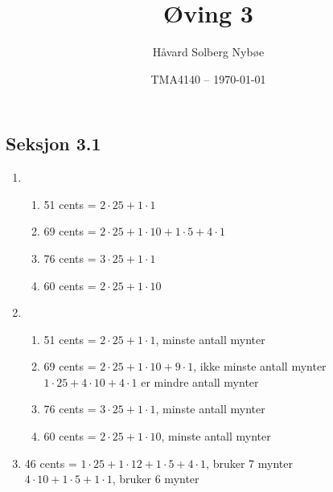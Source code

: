 \documentclass[a4paper, 12pt]{article}  %
\title{Øving 3}                         %
\author{Håvard Solberg Nybøe}           %
\date{TMA4140 -- \today}                %
\begin{document}
\maketitle

\subsection*{Seksjon 3.1}
\begin{enumerate}
    \item [\boxed{57}]
          \begin{enumerate}
              \item 51 cents = $2 \cdot 25 + 1 \cdot 1$
              \item 69 cents = $2 \cdot 25 + 1 \cdot 10 + 1 \cdot 5 + 4 \cdot 1$
              \item 76 cents = $3 \cdot 25 + 1 \cdot 1$
              \item 60 cents = $2 \cdot 25 + 1 \cdot 10$
          \end{enumerate}
    \item [\boxed{59}]
          \begin{enumerate}
              \item 51 cents = $2 \cdot 25 + 1 \cdot 1$, minste antall mynter
              \item 69 cents = $2 \cdot 25 + 1 \cdot 10 + 9 \cdot 1$, ikke minste antall mynter \\
                    $1 \cdot 25 + 4 \cdot 10 + 4 \cdot 1$ er mindre antall mynter
              \item 76 cents = $3 \cdot 25 + 1 \cdot 1$, minste antall mynter
              \item 60 cents = $2 \cdot 25 + 1 \cdot 10$, minste antall mynter
          \end{enumerate}
    \item [\boxed{60}] 46 cents = $1 \cdot 25 + 1 \cdot 12 + 1 \cdot 5 + 4 \cdot 1$, bruker 7 mynter \\
          $4 \cdot 10 + 1 \cdot 5 + 1 \cdot 1$, bruker 6 mynter
\end{enumerate}
\end{document}
